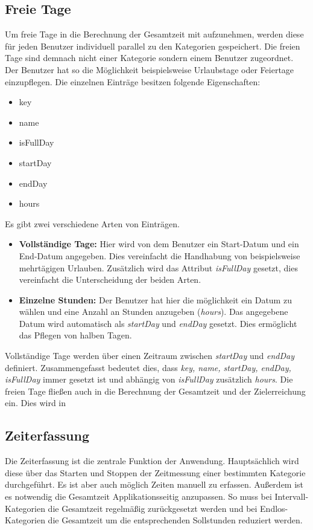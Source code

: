 \subsection{Freie Tage}
Um freie Tage in die Berechnung der Gesamtzeit mit aufzunehmen, werden diese für jeden Benutzer individuell parallel zu
den Kategorien gespeichert. Die freien Tage sind demnach nicht einer Kategorie sondern einem Benutzer zugeordnet. 
Der Benutzer hat so die Möglichkeit beispielsweise Urlaubstage oder Feiertage einzupflegen.
Die einzelnen Einträge besitzen folgende Eigenschaften: 
\begin{itemize}
    \item key
    \item name
    \item isFullDay
    \item startDay
    \item endDay
    \item hours
\end{itemize}
Es gibt zwei verschiedene Arten von Einträgen.
\begin{itemize}
    \item \textbf{Vollständige Tage:} Hier wird von dem Benutzer ein Start-Datum und ein End-Datum angegeben. 
    Dies vereinfacht die Handhabung von beispielsweise mehrtägigen Urlauben. 
    Zusätzlich wird das Attribut \textit{isFullDay} gesetzt, 
    dies vereinfacht die Unterscheidung der beiden Arten.
    \item \textbf{Einzelne Stunden:} Der Benutzer hat hier die möglichkeit ein Datum zu wählen und eine Anzahl an Stunden anzugeben (\textit{hours}). 
    Das angegebene Datum wird automatisch als \textit{startDay} und \textit{endDay} gesetzt. 
    Dies ermöglicht das Pflegen von halben Tagen. 
\end{itemize}Vollständige Tage werden über einen Zeitraum zwischen \textit{startDay} und \textit{endDay} definiert. 
Zusammengefasst bedeutet dies, dass \textit{key, name, startDay, endDay, isFullDay} immer gesetzt ist und abhängig von \textit{isFullDay} zusätzlich \textit{hours}.
Die freien Tage fließen auch in die Berechnung der Gesamtzeit und der Zielerreichung ein. Dies wird in 

\subsection{Zeiterfassung}
Die Zeiterfassung ist die zentrale Funktion der Anwendung.
Hauptsächlich wird diese über das Starten und Stoppen der Zeitmessung einer bestimmten Kategorie durchgeführt.
Es ist aber auch möglich Zeiten manuell zu erfassen.
Außerdem ist es notwendig die Gesamtzeit Applikationsseitig anzupassen.
So muss bei Intervall-Kategorien die Gesamtzeit regelmäßig zurückgesetzt werden
und bei Endlos-Kategorien die Gesamtzeit um die entsprechenden Sollstunden reduziert werden.


